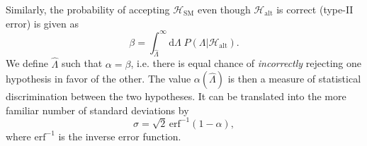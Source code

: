 \documentclass{JHEP3}
\newcommand{\SM}{\mathrm{SM}}
\newcommand{\alt}{\mathrm{alt}}
\def\hLambda {\hat{\Lambda}}
\def\erf{\mathrm{erf}}
\def\Halt{\mathcal{H}_{\mathrm{alt}}}
\begin{document}
Similarly, the probability of accepting $\mathcal{H}_{\SM}$ even though $\mathcal{H}_{\alt}$ is correct (type-II error) is given as 
\begin{equation}
    \beta = \int_{\hLambda}^{\infty} \mathrm{d}\Lambda \; P(\Lambda|\Halt).
\end{equation}
We define $\hLambda$ such that $\alpha=\beta$, i.e. there is equal chance of {\it incorrectly} rejecting one hypothesis in favor of the other. 
The value $\alpha(\hLambda)$ is then a measure of statistical discrimination between the two hypotheses. 
It can be translated into the more familiar number of standard deviations by 
\begin{equation} \label{alphatosig}
    \sigma = \sqrt{2} \, \erf^{-1}(1-\alpha),
\end{equation}
where $\erf^{-1}$ is the inverse error function. 
\end{document}
